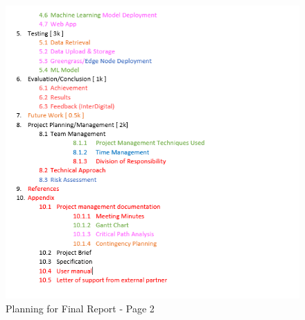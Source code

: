 \begin{figure}[ht]
    \centering
    \includegraphics[width=1\linewidth]{images/report_plan/pg_2.png}
    \caption{Planning for Final Report - Page 2}
    \label{fig:report_plan2}
\end{figure}

